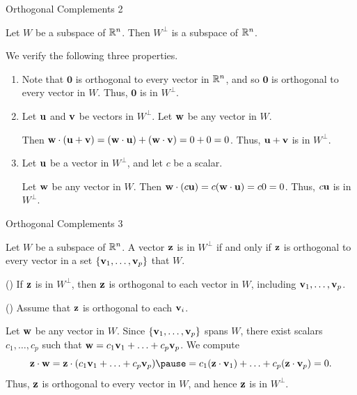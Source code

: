 \documentclass[xcolor=dvipsnames,aspectratio=169,t]{beamer}
\begin{document}
\begin{frame}{Orthogonal Complements 2}
  \begin{theorem}
    Let $W$ be a subspace of $\mathbb{R}^n$.
    Then $W^\perp$ is a \alert{subspace} of $\mathbb{R}^n$.
  \end{theorem}
  \medskip
  
  \pause
  We verify the following three properties.
  
  \begin{enumerate}[<+->]
    \item {}  Note that $\mathbf{0}$ is orthogonal to every vector in $\mathbb{R}^n$, and so $\mathbf{0}$ is orthogonal to every vector in $W$.  Thus, $\mathbf{0}$ is in $W^\perp$.
    \medskip
    
    \item {}
    Let $\mathbf{u}$ and $\mathbf{v}$ be vectors in $W^\perp$.  Let $\mathbf{w}$ be any vector in $W$.
    \smallskip
    
    Then $\mathbf{w} \cdot (\mathbf{u}+\mathbf{v}) = (\mathbf{w} \cdot \mathbf{u}) + (\mathbf{w} \cdot \mathbf{v}) = 0+0 = 0$.
    Thus, $\mathbf{u}+\mathbf{v}$ is in $W^\perp$.
    \medskip
    
    \item {}
    Let $\mathbf{u}$ be a vector in $W^\perp$, and let $c$ be a scalar.
    \smallskip
    
    Let $\mathbf{w}$ be any vector in $W$.
    Then $\mathbf{w} \cdot (c\mathbf{u}) = c(\mathbf{w} \cdot \mathbf{u})= c0 = 0$.
    Thus, $c\mathbf{u}$ is in $W^\perp$.
    \medskip
  \end{enumerate}
  
\end{frame}


\begin{frame}{Orthogonal Complements 3}
  \begin{theorem}
    Let $W$ be a subspace of $\mathbb{R}^n$.
    A vector $\mathbf{z}$ is in $W^{\perp}$ if and only if $\mathbf{z}$ is orthogonal to \alert{every} vector in a set $\{\mathbf{v}_1,\ldots,\mathbf{v}_p\}$ that  $W$.
  \end{theorem}
  \medskip
  
  \pause
  (\blue{$\Rightarrow$}) If $\mathbf{z}$ is in $W^\perp$, then $\mathbf{z}$ is orthogonal to each vector in $W$, including $\mathbf{v}_1,\ldots,\mathbf{v}_p$.
  \bigskip
  
  \pause
  (\blue{$\Leftarrow$})
  Assume that $\mathbf{z}$ is orthogonal to each $\mathbf{v}_i$.
  \smallskip
  
  Let $\mathbf{w}$ be any vector in $W$.
  Since $\{\mathbf{v}_1,\ldots,\mathbf{v}_p\}$ spans $W$,
  there exist scalars $c_1,\ldots,c_p$ such that $\mathbf{w}=c_1 \mathbf{v}_1 + \ldots + c_p \mathbf{v}_p$.
  We compute 
    \[ \z \cdot \w 
      = \z \cdot (c_1 \v_1 + \ldots + c_p \v_p)
      \pause
      = c_1 (\z \cdot \v_1) + \ldots + c_p (\z \cdot \v_p) = 0. \]
  Thus, $\mathbf{z}$ is orthogonal to every vector in $W$, and hence $\mathbf{z}$ is in $W^\perp$.
  \hfill\blue{$\square$}
\end{frame}
\end{document}
